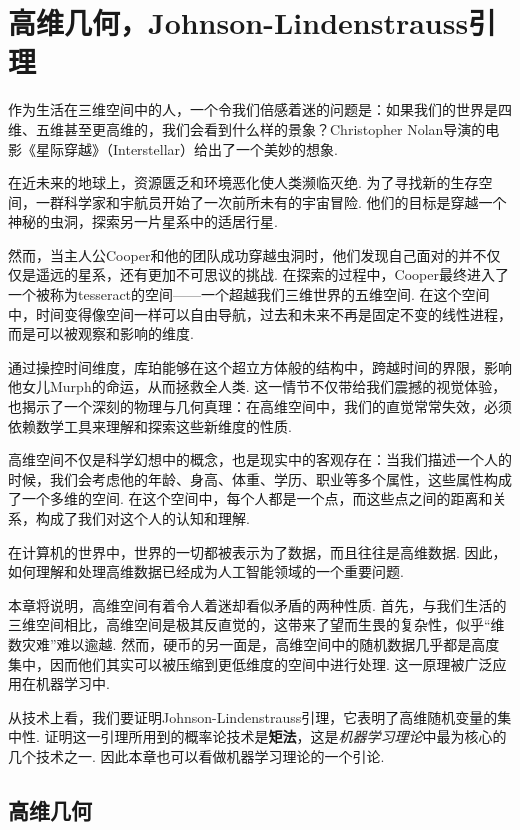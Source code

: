  \chapter{高维几何，Johnson-Lindenstrauss引理}\label{chap:J-L-Lemma}

作为生活在三维空间中的人，一个令我们倍感着迷的问题是：如果我们的世界是四维、五维甚至更高维的，我们会看到什么样的景象？Christopher Nolan导演的电影《星际穿越》（Interstellar）给出了一个美妙的想象. 

在近未来的地球上，资源匮乏和环境恶化使人类濒临灭绝. 为了寻找新的生存空间，一群科学家和宇航员开始了一次前所未有的宇宙冒险. 他们的目标是穿越一个神秘的虫洞，探索另一片星系中的适居行星. 

然而，当主人公Cooper和他的团队成功穿越虫洞时，他们发现自己面对的并不仅仅是遥远的星系，还有更加不可思议的挑战. 在探索的过程中，Cooper最终进入了一个被称为tesseract的空间——一个超越我们三维世界的五维空间. 在这个空间中，时间变得像空间一样可以自由导航，过去和未来不再是固定不变的线性进程，而是可以被观察和影响的维度. 

通过操控时间维度，库珀能够在这个超立方体般的结构中，跨越时间的界限，影响他女儿Murph的命运，从而拯救全人类. 这一情节不仅带给我们震撼的视觉体验，也揭示了一个深刻的物理与几何真理：在高维空间中，我们的直觉常常失效，必须依赖数学工具来理解和探索这些新维度的性质. 

高维空间不仅是科学幻想中的概念，也是现实中的客观存在：当我们描述一个人的时候，我们会考虑他的年龄、身高、体重、学历、职业等多个属性，这些属性构成了一个多维的空间. 在这个空间中，每个人都是一个点，而这些点之间的距离和关系，构成了我们对这个人的认知和理解. 

在计算机的世界中，世界的一切都被表示为了数据，而且往往是高维数据. 因此，如何理解和处理高维数据已经成为人工智能领域的一个重要问题. 

本章将说明，高维空间有着令人着迷却看似矛盾的两种性质. 首先，与我们生活的三维空间相比，高维空间是极其反直觉的，这带来了望而生畏的复杂性，似乎“维数灾难”难以逾越. 然而，硬币的另一面是，高维空间中的随机数据几乎都是高度集中，因而他们其实可以被压缩到更低维度的空间中进行处理. 这一原理被广泛应用在机器学习中. 

从技术上看，我们要证明Johnson-Lindenstrauss引理，它表明了高维随机变量的集中性. 证明这一引理所用到的概率论技术是\textbf{矩法}，这是\emph{机器学习理论}中最为核心的几个技术之一. 因此本章也可以看做机器学习理论的一个引论. 

\section{高维几何}


